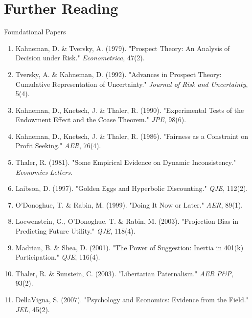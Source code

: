 \documentclass[10pt]{beamer}
\begin{document}
\section*{Further Reading}

\begin{frame}[allowframebreaks]{Foundational Papers}
\footnotesize
\begin{enumerate}
\item Kahneman, D. \& Tversky, A. (1979). "Prospect Theory: An Analysis of Decision under Risk." \emph{Econometrica}, 47(2).
\item Tversky, A. \& Kahneman, D. (1992). "Advances in Prospect Theory: Cumulative Representation of Uncertainty." \emph{Journal of Risk and Uncertainty}, 5(4).
\item Kahneman, D., Knetsch, J. \& Thaler, R. (1990). "Experimental Tests of the Endowment Effect and the Coase Theorem." \emph{JPE}, 98(6).
\item Kahneman, D., Knetsch, J. \& Thaler, R. (1986). "Fairness as a Constraint on Profit Seeking." \emph{AER}, 76(4).
\item Thaler, R. (1981). "Some Empirical Evidence on Dynamic Inconsistency." \emph{Economics Letters}.
\item Laibson, D. (1997). "Golden Eggs and Hyperbolic Discounting." \emph{QJE}, 112(2).
\item O'Donoghue, T. \& Rabin, M. (1999). "Doing It Now or Later." \emph{AER}, 89(1).
\item Loewenstein, G., O'Donoghue, T. \& Rabin, M. (2003). "Projection Bias in Predicting Future Utility." \emph{QJE}, 118(4).
\item Madrian, B. \& Shea, D. (2001). "The Power of Suggestion: Inertia in 401(k) Participation." \emph{QJE}, 116(4).
\item Thaler, R. \& Sunstein, C. (2003). "Libertarian Paternalism." \emph{AER P\&P}, 93(2).
\item DellaVigna, S. (2007). "Psychology and Economics: Evidence from the Field." \emph{JEL}, 45(2).
\end{enumerate}
\end{frame}
\end{document}
